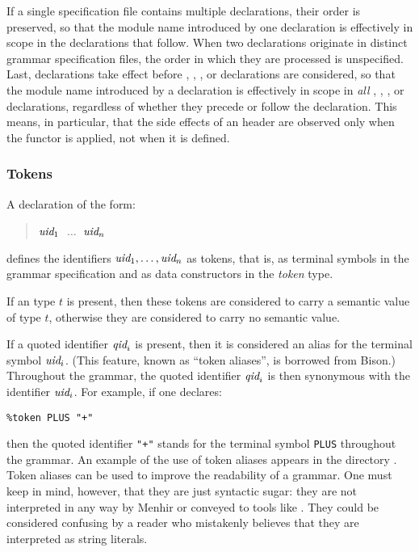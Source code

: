 \documentclass[onecolumn,11pt,nocopyrightspace,preprint]{sigplanconf}
\begin{document}
If a single specification file
contains multiple \dparameter declarations, their order is preserved, so that
the module name  introduced by one declaration is effectively in scope
in the declarations that follow. When two \dparameter declarations originate
in distinct grammar specification files, the order in which they are processed
is unspecified. Last, \dparameter declarations take effect before \dheader{$\ldots$},
\dtoken, \dtype, or \dstart declarations are considered, so that the module name
 introduced by a \dparameter declaration is effectively in scope in
\emph{all} \dheader{$\ldots$}, \dtoken, \dtype, or \dstart declarations,
regardless of whether they precede or follow the \dparameter declaration.
This means, in particular, that the side effects of an \ocaml header are
observed only when the functor is applied, not when it is defined.

\subsubsection{Tokens}
\label{sec:tokens}

A declaration of the form:
\begin{quote}
\dtoken
\optional{\ocamltype}
$\textit{uid}_1$  $\;\ldots\;$
$\textit{uid}_n$ 
\end{quote}
defines the identifiers $\textit{uid}_1, \ldots, \textit{uid}_n$ as tokens, that is,
as terminal symbols in the grammar specification and as data constructors in
the \textit{token} type.

If an \ocaml type $t$ is present, then these tokens are considered to carry a
semantic value of type $t$, otherwise they are considered to carry no semantic
value.

If a quoted identifier $\textit{qid}_i$ is present, then it is considered an alias
for the terminal symbol $\textit{uid}_i$. (This feature, known as ``token
aliases'', is borrowed from Bison.)
Throughout the grammar, the quoted identifier $\textit{qid}_i$ is then
synonymous with the identifier $\textit{uid}_i$.
%
For example, if one declares:
\begin{verbatim}
%token PLUS "+"
\end{verbatim}
then the quoted identifier \texttt{"+"} stands for the terminal symbol
\texttt{PLUS} throughout the grammar. An example of the use of token aliases
appears in the directory .
%
Token aliases can be used to improve the readability of a grammar. One must
keep in mind, however, that they are just syntactic sugar: they are not
interpreted in any way by Menhir or conveyed to tools like \ocamllex.
%
They could be considered confusing by a reader who mistakenly believes that
they are interpreted as string literals.
\end{document}
